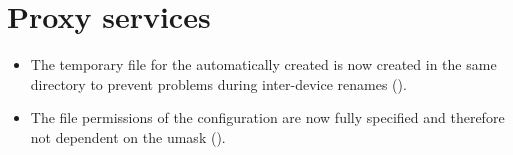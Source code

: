 \section{Proxy services}
\begin{itemize}
\item The temporary file for the automatically created  is now created in the same directory to prevent problems during inter-device renames ().
\item The file permissions of the  configuration are now fully specified and therefore not dependent on the umask ().
\end{itemize}


%

%
%

%


